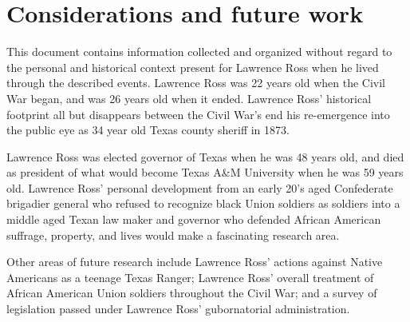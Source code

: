 \documentclass[12pt]{article}
\begin{document}
\newpage
\section{Considerations and future work}
This document contains information collected and organized without regard to the personal and historical context present for Lawrence Ross when he lived through the described events. Lawrence Ross was 22 years old when the Civil War began, and was 26 years old when it ended. Lawrence Ross' historical footprint all but disappears between the Civil War's end his re-emergence into the public eye as 34 year old Texas county sheriff in 1873. 

Lawrence Ross was elected governor of Texas when he was 48 years old, and died as president of what would become Texas A\&M University when he was 59 years old. Lawrence Ross' personal development from an early 20's aged Confederate brigadier general who refused to recognize black Union soldiers as soldiers into a middle aged Texan law maker and governor who defended African American suffrage, property, and lives would make a fascinating research area. 

Other areas of future research include Lawrence Ross' actions against Native Americans as a teenage Texas Ranger; Lawrence Ross' overall treatment of African American Union soldiers throughout the Civil War; and a survey of legislation passed under Lawrence Ross' gubornatorial administration.

\newpage
\printbibliography

\end{document}
